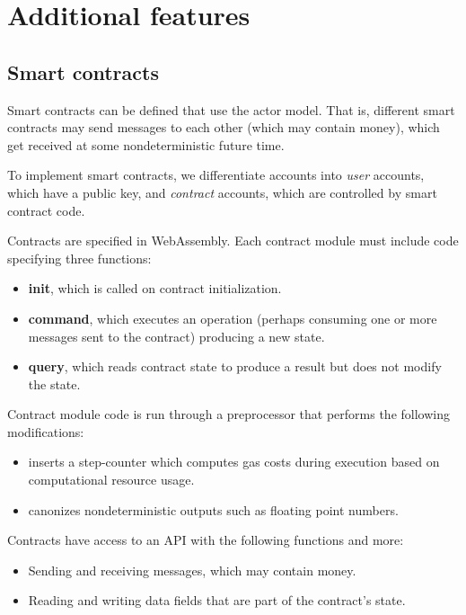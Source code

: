 \documentclass{article}
\begin{document}
\section{Additional features}

  \subsection{Smart contracts}

  Smart contracts can be defined that use the actor model.  That is, different smart contracts may send messages to each other (which may contain money), which get received at some nondeterministic future time.

  To implement smart contracts, we differentiate accounts into \emph{user} accounts, which have a public key, and \emph{contract} accounts, which are controlled by smart contract code.

  Contracts are specified in WebAssembly.  Each contract module must include code specifying three functions:

  \begin{itemize}
    \item \textbf{init}, which is called on contract initialization.
    \item \textbf{command}, which executes an operation (perhaps consuming one or more messages sent to the contract) producing a new state.
    \item \textbf{query}, which reads contract state to produce a result but does not modify the state.

  \end{itemize}

  Contract module code is run through a preprocessor that performs the following modifications:

  \begin{itemize}
    \item inserts a step-counter which computes gas costs during execution based on computational resource usage.
    \item canonizes nondeterministic outputs such as floating point numbers.
  \end{itemize}

  Contracts have access to an API with the following functions and more:

  \begin{itemize}
    \item Sending and receiving messages, which may contain money.
    \item Reading and writing data fields that are part of the contract's state.
  \end{itemize}
\end{document}
